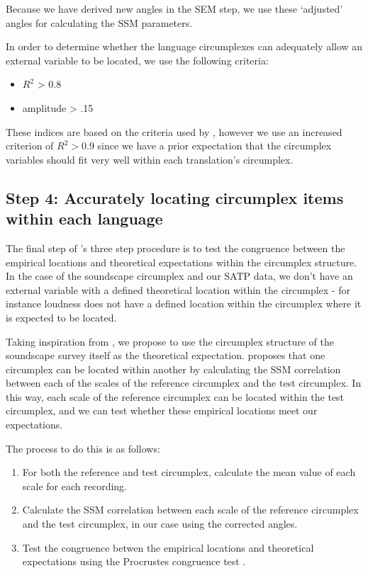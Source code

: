 \documentclass[
  authoryear,
  preprint,
  3p]{elsarticle}
\providecommand{\tightlist}{%
  \setlength{\itemsep}{0pt}\setlength{\parskip}{0pt}}\usepackage{longtable,booktabs,array}
\begin{document}
Because we have derived new angles in the SEM step, we use these
`adjusted' angles for calculating the SSM parameters.

In order to determine whether the language circumplexes can adequately
allow an external variable to be located, we use the following criteria:

\begin{itemize}
\tightlist
\item
  \(R^2\) \textgreater{} 0.8
\item
  amplitude \textgreater{} .15
\end{itemize}

These indices are based on the criteria used by \citet{Rogoza2021three},
however we use an increased criterion of \(R^2 > 0.9\) since we have a
prior expectation that the circumplex variables should fit very well
within each translation's circumplex.

\subsection{Step 4: Accurately locating circumplex items within each
language}\label{step-4-accurately-locating-circumplex-items-within-each-language}

The final step of \citet{Rogoza2021three} 's three step procedure is to
test the congruence between the empirical locations and theoretical
expectations within the circumplex structure. In the case of the
soundscape circumplex and our SATP data, we don't have an external
variable with a defined theoretical location within the circumplex - for
instance loudness does not have a defined location within the circumplex
where it is expected to be located.

Taking inspiration from \citet{Yik2004Relationship}, we propose to use
the circumplex structure of the soundscape survey itself as the
theoretical expectation. \citet{Yik2004Relationship} proposes that one
circumplex can be located within another by calculating the SSM
correlation between each of the scales of the reference circumplex and
the test circumplex. In this way, each scale of the reference circumplex
can be located within the test circumplex, and we can test whether these
empirical locations meet our expectations.

The process to do this is as follows:

\begin{enumerate}
\def\labelenumi{\arabic{enumi}.}
\tightlist
\item
  For both the reference and test circumplex, calculate the mean value
  of each scale for each recording.
\item
  Calculate the SSM correlation between each scale of the reference
  circumplex and the test circumplex, in our case using the corrected
  angles.
\item
  Test the congruence betwen the empirical locations and theoretical
  expectations using the Procrustes congruence test
  \citep{Rogoza2021three}.
\end{enumerate}
\end{document}
